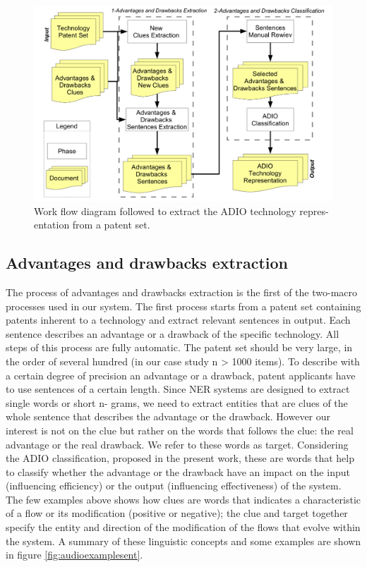 \documentclass[]{book}
\begin{document}
\begin{figure}

{\centering \includegraphics[width=0.8\linewidth]{_bookdown_files/figures/adioworkflow} 

}

\caption{Work flow diagram followed to extract the ADIO technology repres- entation from a patent set.}\label{fig:adioworkflow}
\end{figure}

\subsection{Advantages and drawbacks
extraction}\label{advantages-and-drawbacks-extraction}

The process of advantages and drawbacks extraction is the first of the
two-macro processes used in our system. The first process starts from a
patent set containing patents inherent to a technology and extract
relevant sentences in output. Each sentence describes an advantage or a
drawback of the specific technology. All steps of this process are fully
automatic. The patent set should be very large, in the order of several
hundred (in our case study n \textgreater{} 1000 items). To describe
with a certain degree of precision an advantage or a drawback, patent
applicants have to use sentences of a certain length. Since NER systems
are designed to extract single words or short n- grams, we need to
extract entities that are clues of the whole sentence that describes the
advantage or the drawback. However our interest is not on the clue but
rather on the words that follows the clue: the real advantage or the
real drawback. We refer to these words as target. Considering the ADIO
classification, proposed in the present work, these are words that help
to classify whether the advantage or the drawback have an impact on the
input (influencing efficiency) or the output (influencing effectiveness)
of the system. The few examples above shows how clues are words that
indicates a characteristic of a flow or its modification (positive or
negative); the clue and target together specify the entity and direction
of the modification of the flows that evolve within the system. A
summary of these linguistic concepts and some examples are shown in
figure \ref{fig:audioexamplesent}.
\end{document}
